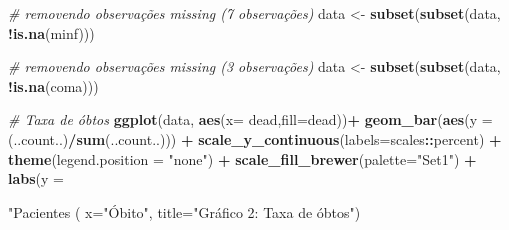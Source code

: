 \documentclass[]{article}
\newenvironment{Shaded}{\begin{snugshade}}{\end{snugshade}}
\newcommand{\KeywordTok}[1]{\textcolor[rgb]{0.13,0.29,0.53}{\textbf{#1}}}
\newcommand{\DataTypeTok}[1]{\textcolor[rgb]{0.13,0.29,0.53}{#1}}
\newcommand{\StringTok}[1]{\textcolor[rgb]{0.31,0.60,0.02}{#1}}
\newcommand{\CommentTok}[1]{\textcolor[rgb]{0.56,0.35,0.01}{\textit{#1}}}
\newcommand{\OperatorTok}[1]{\textcolor[rgb]{0.81,0.36,0.00}{\textbf{#1}}}
\newcommand{\NormalTok}[1]{#1}
\begin{document}
\begin{Shaded}
\begin{Highlighting}[]
\CommentTok{# removendo observações missing (7 observações)}
\NormalTok{data <-}\StringTok{ }\KeywordTok{subset}\NormalTok{(}\KeywordTok{subset}\NormalTok{(data, }\OperatorTok{!}\KeywordTok{is.na}\NormalTok{(minf)))}

\CommentTok{# removendo observações missing (3 observações)}
\NormalTok{data <-}\StringTok{ }\KeywordTok{subset}\NormalTok{(}\KeywordTok{subset}\NormalTok{(data, }\OperatorTok{!}\KeywordTok{is.na}\NormalTok{(coma)))}

\CommentTok{# Taxa de óbtos}
\KeywordTok{ggplot}\NormalTok{(data, }\KeywordTok{aes}\NormalTok{(}\DataTypeTok{x=}\NormalTok{ dead,}\DataTypeTok{fill=}\NormalTok{dead))}\OperatorTok{+}\StringTok{ }
\StringTok{          }\KeywordTok{geom_bar}\NormalTok{(}\KeywordTok{aes}\NormalTok{(}\DataTypeTok{y =}\NormalTok{ (..count..)}\OperatorTok{/}\KeywordTok{sum}\NormalTok{(..count..))) }\OperatorTok{+}\StringTok{ }
\StringTok{          }\KeywordTok{scale_y_continuous}\NormalTok{(}\DataTypeTok{labels=}\NormalTok{scales}\OperatorTok{::}\NormalTok{percent) }\OperatorTok{+}
\StringTok{  }\KeywordTok{theme}\NormalTok{(}\DataTypeTok{legend.position =} \StringTok{"none"}\NormalTok{) }\OperatorTok{+}
\StringTok{  }\KeywordTok{scale_fill_brewer}\NormalTok{(}\DataTypeTok{palette=}\StringTok{"Set1"}\NormalTok{) }\OperatorTok{+}
\StringTok{  }\KeywordTok{labs}\NormalTok{(}\DataTypeTok{y =} \StringTok{"Pacientes (%
       \DataTypeTok{x=}\StringTok{"Óbito"}\NormalTok{,}
       \DataTypeTok{title=}\StringTok{"Gráfico 2: Taxa de óbtos"}\NormalTok{)}

}
\end{Highlighting}
\end{Shaded}
\end{document}
